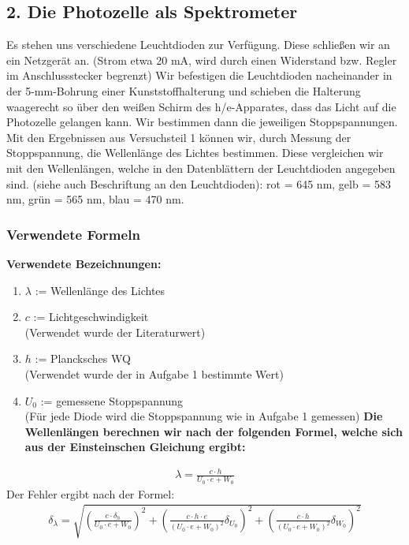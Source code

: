 \documentclass[12px]{scrartcl}
\begin{document}
\subsection{2. Die Photozelle als Spektrometer}
Es stehen uns verschiedene Leuchtdioden zur Verfügung. Diese schließen wir an ein Netzgerät an.
(Strom etwa 20 mA, wird durch einen Widerstand bzw. Regler im Anschlussstecker begrenzt)
Wir befestigen die Leuchtdioden nacheinander in der 5-mm-Bohrung einer Kunststoffhalterung und schieben die Halterung waagerecht so über den weißen Schirm des h/e-Apparates, dass das Licht auf die Photozelle gelangen kann. Wir bestimmen dann die jeweiligen Stoppspannungen.
Mit den Ergebnissen aus Versuchsteil 1 können wir, durch Messung der Stoppspannung, die Wellenlänge des Lichtes bestimmen. Diese vergleichen wir mit den Wellenlängen, welche in den Datenblättern der Leuchtdioden angegeben sind. (siehe auch Beschriftung an den Leuchtdioden):
rot = 645 nm, gelb = 583 nm, grün = 565 nm, blau = 470 nm.
\subsubsection{Verwendete Formeln}
\textbf{Verwendete Bezeichnungen:}
\begin{enumerate}
\item $\lambda$ := Wellenlänge des Lichtes
\item $c$ := Lichtgeschwindigkeit\\
(Verwendet wurde der Literaturwert)
\item $h$ := Plancksches WQ\\
(Verwendet wurde der in Aufgabe 1 bestimmte Wert)
\item $U_0$ := gemessene Stoppspannung\\
(Für jede Diode wird die Stoppspannung wie in Aufgabe 1 gemessen)
\textbf{Die Wellenlängen berechnen wir nach der folgenden Formel, welche sich aus der Einsteinschen Gleichung ergibt:}
\end{enumerate}
\begin{align}
\lambda = \frac{c \cdot h}{U_0\cdot e + W_0}
\end{align}
Der Fehler ergibt nach der Formel:
\begin{align}
\delta_{\lambda} = \sqrt{
\left(\frac{c \cdot\delta_h}{U_0\cdot e + W_0}\right)^2+
\left(\frac{c \cdot h \cdot e}{(U_0\cdot e + W_0)^2}\delta_{U_0}\right)^2+
\left(\frac{c \cdot h}{(U_0\cdot e + W_0)^2}\delta_{W_0}\right)^2}
\end{align}
\end{document}
